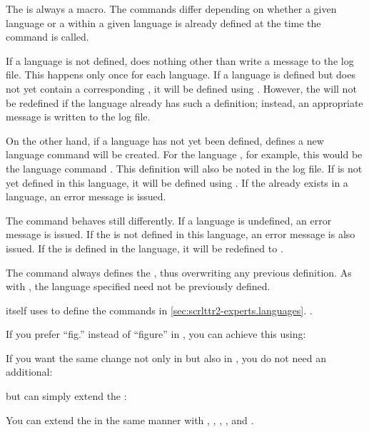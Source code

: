 The  is always a macro. The commands differ depending on whether a
given language or a  within a given language is already defined at
the time the command is called.

If a language is not defined,  does nothing other
than write a message to the log file. This happens only once for each
language. If a language is defined but does not yet contain a corresponding
, it will be defined using . However, the
 will not be redefined if the language already has such a
definition; instead, an appropriate message is written to the log file.

On the other hand, if a language has not yet been defined,
 defines a new language command will be created. For the
language , for example, this would be the language command
. This definition will also be noted in the log file.
If  is not yet defined in this language, it will be defined using
. If the  already exists in a language, an error
message is issued.

The  command behaves still differently. If a language
is undefined, an error message is issued. If the  is not defined
in this language, an error message is also issued. If the  is
defined in the language, it will be redefined to .

The  command always
defines the , thus overwriting any previous definition. As with
, the language specified need not be previously
defined.

\KOMAScript{} itself uses  to define the commands in
\autoref{sec:scrlttr2-experts.languages}.
.

\begin{Example}
  If you prefer ``fig.'' instead of ``figure'' in , you can
  achieve this using:
\begin{lstcode}
\end{lstcode}
  If you want the same change not only in  but also in
  , you do not need an additional:
\begin{lstcode}
\end{lstcode}
  but can simply extend the :
\begin{lstcode}
\end{lstcode}
  You can extend the  in the same manner with
  , , , ,
  and .
\end{Example}


